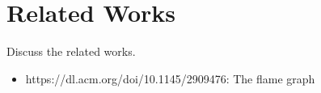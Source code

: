 \section{Related Works}

Discuss the related works.

\begin{itemize}
	\item https://dl.acm.org/doi/10.1145/2909476: The flame graph
\end{itemize}
